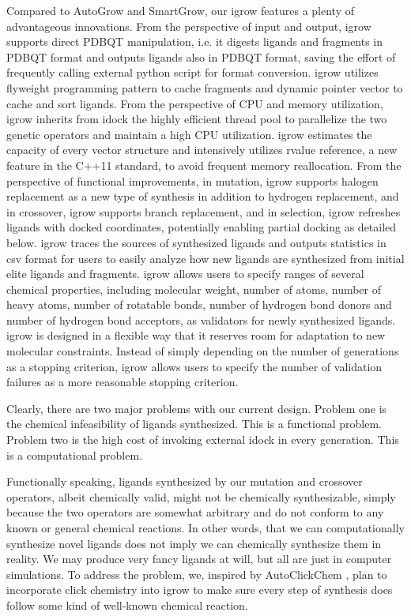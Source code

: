 Compared to AutoGrow and SmartGrow, our igrow features a plenty of advantageous innovations. From the perspective of input and output, igrow supports direct PDBQT manipulation, i.e. it digests ligands and fragments in PDBQT format and outputs ligands also in PDBQT format, saving the effort of frequently calling external python script for format conversion. igrow utilizes flyweight programming pattern to cache fragments and dynamic pointer vector to cache and sort ligands. From the perspective of CPU and memory utilization, igrow inherits from idock the highly efficient thread pool to parallelize the two genetic operators and maintain a high CPU utilization. igrow estimates the capacity of every vector structure and intensively utilizes rvalue reference, a new feature in the C++11 standard, to avoid frequent memory reallocation. From the perspective of functional improvements, in mutation, igrow supports halogen replacement as a new type of synthesis in addition to hydrogen replacement, and in crossover, igrow supports branch replacement, and in selection, igrow refreshes ligands with docked coordinates, potentially enabling partial docking as detailed below. igrow traces the sources of synthesized ligands and outputs statistics in csv format for users to easily analyze how new ligands are synthesized from initial elite ligands and fragments. igrow allows users to specify ranges of several chemical properties, including molecular weight, number of atoms, number of heavy atoms, number of rotatable bonds, number of hydrogen bond donors and number of hydrogen bond acceptors, as validators for newly synthesized ligands. igrow is designed in a flexible way that it reserves room for adaptation to new molecular constraints. Instead of simply depending on the number of generations as a stopping criterion, igrow allows users to specify the number of validation failures as a more reasonable stopping criterion.

Clearly, there are two major problems with our current design. Problem one is the chemical infeasibility of ligands synthesized. This is a functional problem. Problem two is the high cost of invoking external idock in every generation. This is a computational problem.

Functionally speaking, ligands synthesized by our mutation and crossover operators, albeit chemically valid, might not be chemically synthesizable, simply because the two operators are somewhat arbitrary and do not conform to any known or general chemical reactions. In other words, that we can computationally synthesize novel ligands does not imply we can chemically synthesize them in reality. We may produce very fancy ligands at will, but all are just in computer simulations. To address the problem, we, inspired by AutoClickChem \citep{1051}, plan to incorporate click chemistry into igrow to make sure every step of synthesis does follow some kind of well-known chemical reaction.

